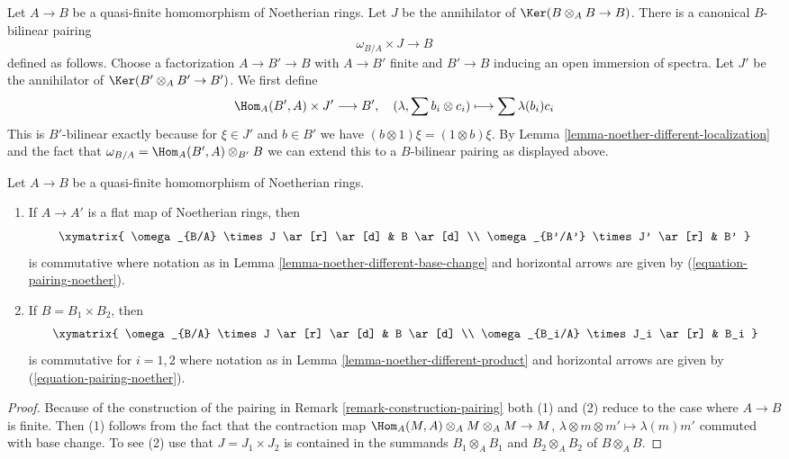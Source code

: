 \begin{remark}
\label{remark-construction-pairing}
Let $A \to B$ be a quasi-finite homomorphism of Noetherian rings.
Let $J$ be the annihilator of $\Ker(B \otimes_A B \to B)$.
There is a canonical $B$-bilinear pairing
\begin{equation}
\label{equation-pairing-noether}
\omega_{B/A} \times J \longrightarrow B
\end{equation}
defined as follows. Choose a factorization $A \to B' \to B$
with $A \to B'$ finite and $B' \to B$ inducing an open immersion
of spectra. Let $J'$ be the annihilator of $\Ker(B' \otimes_A B' \to B')$.
We first define
$$
\Hom_A(B', A) \times J' \longrightarrow B',\quad
(\lambda, \sum b_i \otimes c_i) \longmapsto \sum \lambda(b_i)c_i
$$
This is $B'$-bilinear exactly because for $\xi \in J'$ and $b \in B'$
we have $(b \otimes 1)\xi = (1 \otimes b)\xi$. By
Lemma \ref{lemma-noether-different-localization}
and the fact that $\omega_{B/A} = \Hom_A(B', A) \otimes_{B'} B$
we can extend this to a $B$-bilinear pairing as displayed above.
\end{remark}

\begin{lemma}
\label{lemma-noether-pairing-compatibilities}
Let $A \to B$ be a quasi-finite homomorphism of Noetherian rings.
\begin{enumerate}
\item If $A \to A'$ is a flat map of Noetherian rings, then
$$
\xymatrix{
\omega_{B/A} \times J \ar[r] \ar[d] & B \ar[d]  \\
\omega_{B'/A'} \times J' \ar[r] & B'
}
$$
is commutative where notation as in
Lemma \ref{lemma-noether-different-base-change}
and horizontal arrows are given by
(\ref{equation-pairing-noether}).
\item If $B = B_1 \times B_2$, then
$$
\xymatrix{
\omega_{B/A} \times J \ar[r] \ar[d] & B \ar[d]  \\
\omega_{B_i/A} \times J_i \ar[r] & B_i
}
$$
is commutative for $i = 1, 2$ where notation as in
Lemma \ref{lemma-noether-different-product}
and horizontal arrows are given by
(\ref{equation-pairing-noether}).
\end{enumerate}
\end{lemma}

\begin{proof}
Because of the construction of the pairing in
Remark \ref{remark-construction-pairing}
both (1) and (2) reduce to the case where $A \to B$ is finite.
Then (1) follows from the fact that the contraction map
$\Hom_A(M, A) \otimes_A M \otimes_A M \to M$,
$\lambda \otimes m \otimes m' \mapsto \lambda(m)m'$
commuted with base change. To see (2) use that
$J = J_1 \times J_2$ is contained in the summands
$B_1 \otimes_A B_1$ and $B_2 \otimes_A B_2$
of $B \otimes_A B$.
\end{proof}

